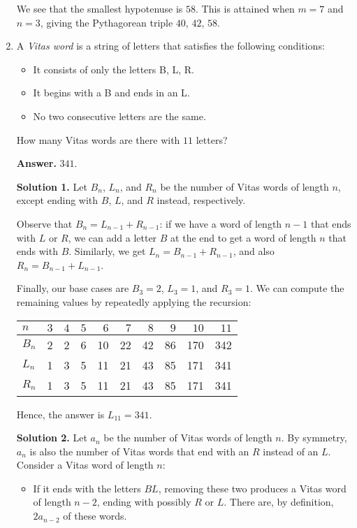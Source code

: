 \documentclass[11pt,paper=letter]{scrartcl}
\begin{document}
\begin{enumerate}[left=0pt]
We see that the smallest hypotenuse is $58$. This is attained when $m = 7$ and $n = 3$, giving the Pythagorean triple $40$, $42$, $58$.

\item A \emph{Vitas word} is a string of letters that satisfies the following conditions:
\begin{itemize}
  \item It consists of only the letters B, L, R.
  \item It begins with a B and ends in an L.
  \item No two consecutive letters are the same.
\end{itemize}
How many Vitas words are there with $11$ letters?

{\sffamily \bfseries Answer.} $\boxed{341}$.

{\sffamily \bfseries Solution 1.} Let $B_n$, $L_n$, and $R_n$ be the number of Vitas words of length $n$, except ending with $B$, $L$, and $R$ instead, respectively. 

Observe that $B_n = L_{n-1} + R_{n-1}$: if we have a word of length $n-1$ that ends with $L$ or $R$, we can add a letter $B$ at the end to get a word of length $n$ that ends with $B$. Similarly, we get $L_n = B_{n-1} + R_{n-1}$, and also $R_n = B_{n-1} + L_{n-1}$.

Finally, our base cases are $B_3 = 2$, $L_3 = 1$, and $R_3 = 1$. We can compute the remaining values by repeatedly applying the recursion:

\begin{center}
\begin{tabular}{l|rrrrrrrrr}
$n$ & $3$ & $4$ & $5$ & $6$ & $7$ & $8$ & $9$ & $10$ & $11$ \\ \hline
$B_n$ & 2 & 2 & 6 & 10 & 22 & 42 & 86 & 170 & 342 \\
$L_n$ & 1 & 3 & 5 & 11 & 21 & 43 & 85 & 171 & 341 \\
$R_n$ & 1 & 3 & 5 & 11 & 21 & 43 & 85 & 171 & 341
\end{tabular}
\end{center}

Hence, the answer is $L_{11} = 341$.

{\sffamily \bfseries Solution 2.} Let $a_n$ be the number of Vitas words of length $n$. By symmetry, $a_n$ is also the number of Vitas words that end with an $R$ instead of an $L$. Consider a Vitas word of length $n$:
\begin{itemize}
  \item If it ends with the letters $BL$, removing these two produces a Vitas word of length $n-2$, ending with possibly $R$ or $L$. There are, by definition, $2a_{n-2}$ of these words.


\end{itemize}
\end{enumerate}
\end{document}
